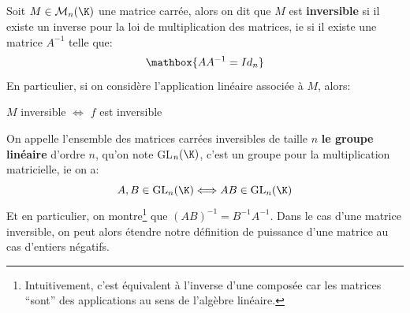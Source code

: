 \subsection*{}

Soit \(M \in \mathcal{M}_n(\K)\) une matrice carrée, alors on dit que \(M\) est \textbf{inversible} si il existe un inverse pour la loi de multiplication des matrices, ie si il existe une matrice \(A^{-1}\) telle que:
\[
   \mathbox{AA^{-1}=Id_n}   
\]
En particulier, si on considère l'application linéaire associée à \(M\), alors:
\begin{center}
   \(M\) inversible \(\Longleftrightarrow\) \(f\) est inversible
\end{center}

On appelle l'ensemble des matrices carrées inversibles de taille \(n\) \textbf{le groupe linéaire} d'ordre \(n\), qu'on note GL\(_n(\K)\), c'est un groupe pour la multiplication matricielle, ie on a:
\[
   A, B \in \text{GL}_n(\K) \Longleftrightarrow AB \in \text{GL}_n(\K)
\]
Et en particulier, on montre\footnote[1]{Intuitivement, c'est équivalent à l'inverse d'une composée car les matrices ``sont'' des applications au sens de l'algèbre linéaire.} que \((AB)^{-1} = B^{-1}A^{-1}\). Dans le cas d'une matrice inversible, on peut alors étendre notre définition de puissance d'une matrice au cas d'entiers négatifs.\<


